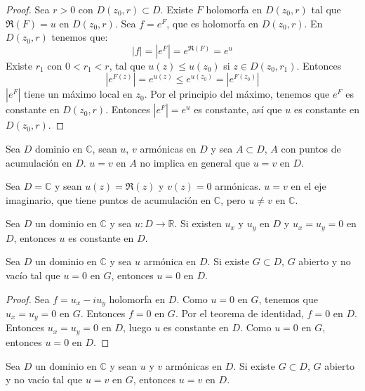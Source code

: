 \begin{proof}
    Sea $r > 0$ con $D(z_0, r) \subset D$.
    Existe $F$ holomorfa en $D(z_0, r)$ tal que $\Re(F) = u$ en $D(z_0, r)$.
    Sea $f = e^F$, que es holomorfa en $D(z_0, r)$.
    En $D(z_0, r)$ tenemos que:
    $$|f| = |e^F| = e^{\Re(F)} = e^u$$
    Existe $r_1$ con $0 < r_1 < r$, tal que $u(z) \leq u(z_0)$ si $z \in D(z_0, r_1)$.
    Entonces
    $$|e^{F(z)}| = e^{u(z)} \leq e^{u(z_0)} = |e^{F(z_0)}|$$
    $|e^F|$ tiene un máximo local en $z_0$.
    Por el principio del máximo, tenemos que $e^F$ es constante en $D(z_0, r)$.
    Entonces $|e^F| = e^u$ es constante, así que $u$ es constante en $D(z_0, r)$.
\end{proof}

Sea $D$ dominio en $\mathbb{C}$, sean $u$, $v$ armónicas en $D$ y sea $A \subset D$, $A$ con puntos de acumulación en $D$.
$u = v$ en $A$ no implica en general que $u = v$ en $D$.

\begin{example}[Contraejemplo]
    Sea $D = \mathbb{C}$ y sean $u(z) = \Re(z)$ y $v(z) = 0$ armónicas.
    $u = v$ en el eje imaginario, que tiene puntos de acumulación en $\mathbb{C}$, pero $u \neq v$ en $\mathbb{C}$.
\end{example}

\begin{remark}
    Sea $D$ un dominio en $\mathbb{C}$ y sea $u: D \to \mathbb{R}$.
    Si existen $u_x$ y $u_y$ en $D$ y $u_x = u_y = 0$ en $D$, entonces $u$ es constante en $D$.
\end{remark}

\begin{theorem}
    Sea $D$ un dominio en $\mathbb{C}$ y sea $u$ armónica en $D$.
    Si existe $G \subset D$, $G$ abierto y no vacío tal que $u = 0$ en $G$, entonces $u = 0$ en $D$.
\end{theorem}

\begin{proof}
    Sea $f = u_x - iu_y$ holomorfa en $D$.
    Como $u = 0$ en $G$, tenemos que $u_x = u_y = 0$ en $G$.
    Entonces $f = 0$ en $G$.
    Por el teorema de identidad, $f = 0$ en $D$.
    Entonces $u_x = u_y = 0$ en $D$, luego $u$ es constante en $D$.
    Como $u = 0$ en $G$, entonces $u = 0$ en $D$.
\end{proof}

\begin{corollary}
    Sea $D$ un dominio en $\mathbb{C}$ y sean $u$ y $v$ armónicas en $D$.
    Si existe $G \subset D$, $G$ abierto y no vacío tal que $u = v$ en $G$, entonces $u = v$ en $D$.
\end{corollary}

